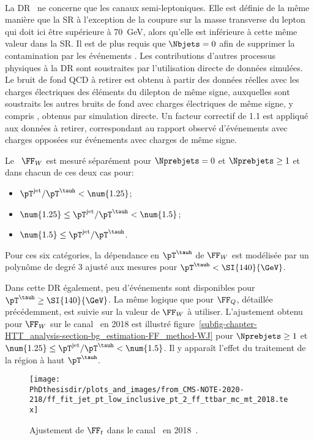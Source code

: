 \paragraph{\Wjets}
La DR \Wjets\ ne concerne que les canaux semi-leptoniques.
Elle est définie de la même manière que la SR à l'exception de la coupure sur la masse transverse du lepton qui doit ici être supérieure à \SI{70}{\GeV}, alors qu'elle est inférieure à cette même valeur dans la SR.
Il est de plus requis que $\Nbjets=0$ afin de supprimer la contamination par les événements \ttbar.
Les contributions d'autres processus physiques à la DR sont soustraites par l'utilisation directe de données simulées.
Le bruit de fond QCD à retirer est obtenu à partir des données réelles avec les charges électriques des éléments du dilepton de même signe, auxquelles sont soustraits les autres bruits de fond avec charges électriques de même signe, y compris \Wjets, obtenus par simulation directe.
Un facteur correctif de \num{1.1} est appliqué aux données à retirer, correspondant au rapport observé d'événements avec charges opposées sur événements avec charges de même signe.
\par
Le \fakefactor\ $\FF_W$ est mesuré séparément pour
$\Nprebjets=0$
et
$\Nprebjets\geq1$
et dans chacun de ces deux cas pour:
\begin{itemize}
\item $\pT^\text{jet}/\pT^{\tauh} < \num{1.25}$;
\item $\num{1.25} \leq \pT^\text{jet}/\pT^{\tauh} < \num{1.5}$;
\item $\num{1.5} \leq \pT^\text{jet}/\pT^{\tauh}$.
\end{itemize}
Pour ces six catégories, la dépendance en $\pT^{\tauh}$ de $\FF_W$ est modélisée par un polynôme de degré 3 ajusté aux mesures pour $\pT^{\tauh}<\SI{140}{\GeV}$.
\par
Dans cette DR également, peu d'événements sont disponibles pour $\pT^{\tauh}\geq\SI{140}{\GeV}$.
La même logique que pour $\FF_Q$, détaillée précédemment, est suivie sur la valeur de $\FF_W$ à utiliser.
L'ajustement obtenu pour $\FF_W$ sur le canal \mu\tauh\ en 2018 est illustré figure~\ref{subfig-chapter-HTT_analysis-section-bg_estimation-FF_method-WJ} pour $\Nprebjets\geq1$ et $\num{1.25} \leq \pT^\text{jet}/\pT^{\tauh} < \num{1.5}$.
Il y apparaît l'effet du traitement de la région à haut $\pT^{\tauh}$.
\begin{wrapfigure}[20]{R}{.46\textwidth}
\centering
\texttt{[image: \\PhDthesisdir/plots\_and\_images/from\_CMS-NOTE-2020-218/ff\_fit\_jet\_pt\_low\_inclusive\_pt\_2\_ff\_ttbar\_mc\_mt\_2018.tex]}
\caption[Ajustement de $\FF_t$ dans le canal \mu\tauh\ en 2018.]{Ajustement de $\FF_t$ dans le canal \mu\tauh\ en 2018~\cite{CMS-NOTE-2020-218}.}
\label{subfig-chapter-HTT_analysis-section-bg_estimation-FF_method-ttbar}
\end{wrapfigure}
